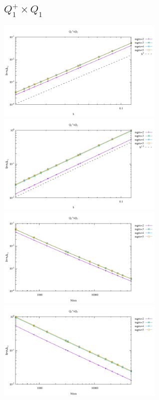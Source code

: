 \subsection*{$Q_1^+\times Q_1$}

\begin{center}
\includegraphics[width=8cm]{python_codes/fieldstone_120/results/Q1+Q1-velocity-h.pdf}
\includegraphics[width=8cm]{python_codes/fieldstone_120/results/Q1+Q1-pressure-h.pdf}
\includegraphics[width=8cm]{python_codes/fieldstone_120/results/Q1+Q1-velocity-Nfem.pdf}
\includegraphics[width=8cm]{python_codes/fieldstone_120/results/Q1+Q1-pressure-Nfem.pdf}
\end{center}

